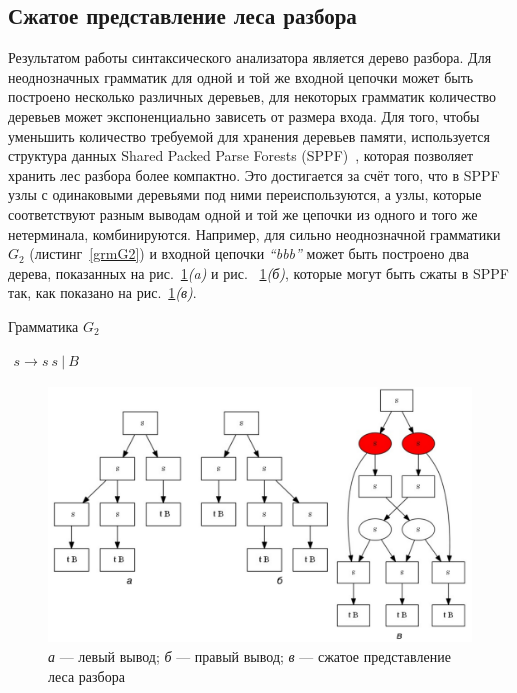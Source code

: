 \subsection{Сжатое представление леса разбора}
Результатом работы синтаксического анализатора является дерево разбора. Для неоднозначных грамматик для одной и той же входной цепочки может быть построено несколько различных деревьев, для некоторых грамматик количество деревьев может экспоненциально зависеть от размера входа. Для того, чтобы уменьшить количество требуемой для хранения деревьев памяти, используется структура данных Shared Packed Parse Forests (SPPF)~\cite{SPPF}, которая позволяет хранить лес разбора более компактно. Это достигается за счёт того, что в SPPF узлы с одинаковыми деревьями под ними переиспользуются, а узлы, которые соответствуют разным выводам одной и той же цепочки из одного и того же нетерминала, комбинируются. Например, для сильно неоднозначной грамматики $G_2$ (листинг~\ref{grmG2}) и входной цепочки  {\it ``bbb''} может быть построено два дерева, показанных на рис.~\ref{SPPF1}{\it (a)} и рис. ~\ref{SPPF1}{\it (б)}, которые могут быть сжаты в SPPF так, как показано на рис.~\ref{SPPF1}{\it (в)}.

\begin{listing}
\caption{Грамматика $G_2$}
\label{grmG2}
\centering
$\begin{array}{rl}
s \rightarrow s \ s \ | \ B
\end{array}$
\end{listing}

\begin{figure}
 \centering
 \includegraphics[width=\textwidth]{Ragozina/pics/SPPF1.pdf}
 \caption{{\it а} --- левый вывод; {\it б} --- правый вывод; {\it в} --- сжатое представление леса разбора }
 \label{SPPF1}
\end{figure}

